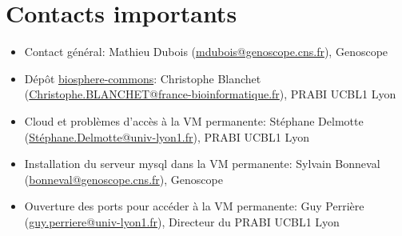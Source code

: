\section{Contacts importants}

\begin{itemize}
	\item Contact général: Mathieu Dubois (\href{mailto:mdubois@genoscope.cns.fr}{mdubois@genoscope.cns.fr}), Genoscope
	\item Dépôt \href{https://github.com/IFB-ElixirFr/biosphere-commons}{biosphere-commons}: Christophe Blanchet (\href{mailto:Christophe.BLANCHET@france-bioinformatique.fr}{Christophe.BLANCHET@france-bioinformatique.fr}), PRABI UCBL1 Lyon
	\item Cloud  et problèmes d'accès à la VM permanente: Stéphane Delmotte (\href{mailto:Stéphane.Delmotte@univ-lyon1.fr}{Stéphane.Delmotte@univ-lyon1.fr}), PRABI UCBL1 Lyon
	\item Installation du serveur mysql dans la VM permanente: Sylvain Bonneval (\href{mailto:bonneval@genoscope.cns.fr}{bonneval@genoscope.cns.fr}), Genoscope
	\item Ouverture des ports pour accéder à la VM permanente: Guy Perrière (\href{mailto:guy.perriere@univ-lyon1.fr}{guy.perriere@univ-lyon1.fr}), Directeur du PRABI UCBL1 Lyon
\end{itemize}
